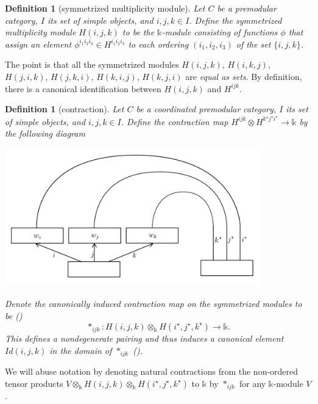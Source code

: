 \documentclass[12pt]{extarticle}
\numberwithin{equation}{section} %
\theoremstyle{mystyle}
\newtheorem{definition}[equation]{Definition}
\newcommand{\details}[1]{
    {\color{OliveGreen} #1} \\}
\begin{document}
\begin{definition}[symmetrized multiplicity module]\label{def/symmetrized-multiplicity-module}
  Let $C$ be a premodular category, $I$ its set of simple objects, and
  $i, j, k \in I$. Define the symmetrized multiplicity module
  $H(i,j,k)$ to be the $\mathbb{k}$-module consisting of
  functions $\phi$ that assign an element
  $\phi^{i_{1}i_{2}i_{3}} \in H^{i_{1}i_{2}i_{3}}$ to each
  ordering $(i_{1}, i_{2}, i_{3})$ of the set $\{i, j, k\}$.
\end{definition}

\noindent The point is that all the symmetrized modules
$H(i,j,k)$, $H(i,k,j)$, $H(j,i,k)$, $H(j,k,i)$, $H(k,i,j)$,
$H(k,j,i)$ are \textit{equal as sets}. By definition, there is a
canonical identification between $H(i,j,k)$ and $H^{ijk}$.

\begin{definition}[contraction]\label{def/contraction}
  Let $C$ be a coordinated premodular category, $I$ its set of
  simple objects, and $i, j, k \in I$. Define the contraction map
  $H^{ijk} \otimes H^{k^{\star}j^{\star}i^{\star}} \to \mathbb{k}$
  by the following diagram \details{\cite[figure
    VI.3.5]{turaev-qiok-3-manifolds}}
  \begin{center}
    \includegraphics[height=6cm]{pairing}
  \end{center}
  Denote the canonically induced contraction map on the
  symmetrized modules to be
  (\cite[p.334]{turaev-qiok-3-manifolds})
  $$\ast_{ijk}: H(i,j,k) \otimes_{\mathbb{k}} H(i^{\star}, j^{\star}, k^{\star}) \to \mathbb{k}.$$
  This defines a nondegenerate pairing and thus induces a
  canonical element $Id(i,j,k)$ in the domain of $\ast_{ijk}$
  (\cite[p.333]{turaev-qiok-3-manifolds}).
\end{definition}

\noindent We will abuse notation by denoting natural contractions
from the non-ordered tensor products
$V \otimes_{\mathbb{k}} H(i,j,k) \otimes_{\mathbb{k}} H(i^{\star}, j^{\star}, k^{\star})$
to $\mathbb{k}$ by $\ast_{ijk}$ for any $\mathbb{k}$-module $V$.
\end{document}
